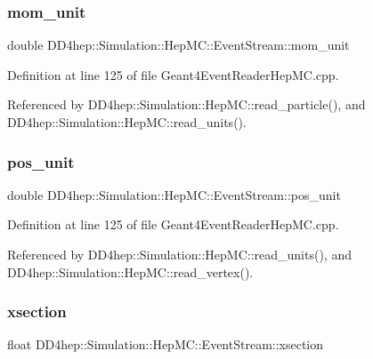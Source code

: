 \subsubsection{\texorpdfstring{mom\+\_\+unit}{mom\_unit}}
{\footnotesize\ttfamily double D\+D4hep\+::\+Simulation\+::\+Hep\+M\+C\+::\+Event\+Stream\+::mom\+\_\+unit}



Definition at line 125 of file Geant4\+Event\+Reader\+Hep\+M\+C.\+cpp.



Referenced by D\+D4hep\+::\+Simulation\+::\+Hep\+M\+C\+::read\+\_\+particle(), and D\+D4hep\+::\+Simulation\+::\+Hep\+M\+C\+::read\+\_\+units().

\hypertarget{class_d_d4hep_1_1_simulation_1_1_hep_m_c_1_1_event_stream_ab528124a867412138e1d22b2310c1bad}{}\label{class_d_d4hep_1_1_simulation_1_1_hep_m_c_1_1_event_stream_ab528124a867412138e1d22b2310c1bad} 
\subsubsection{\texorpdfstring{pos\+\_\+unit}{pos\_unit}}
{\footnotesize\ttfamily double D\+D4hep\+::\+Simulation\+::\+Hep\+M\+C\+::\+Event\+Stream\+::pos\+\_\+unit}



Definition at line 125 of file Geant4\+Event\+Reader\+Hep\+M\+C.\+cpp.



Referenced by D\+D4hep\+::\+Simulation\+::\+Hep\+M\+C\+::read\+\_\+units(), and D\+D4hep\+::\+Simulation\+::\+Hep\+M\+C\+::read\+\_\+vertex().

\hypertarget{class_d_d4hep_1_1_simulation_1_1_hep_m_c_1_1_event_stream_a3f6b9fa99fe2752282e3650c51ad4918}{}\label{class_d_d4hep_1_1_simulation_1_1_hep_m_c_1_1_event_stream_a3f6b9fa99fe2752282e3650c51ad4918} 
\subsubsection{\texorpdfstring{xsection}{xsection}}
{\footnotesize\ttfamily float D\+D4hep\+::\+Simulation\+::\+Hep\+M\+C\+::\+Event\+Stream\+::xsection}



